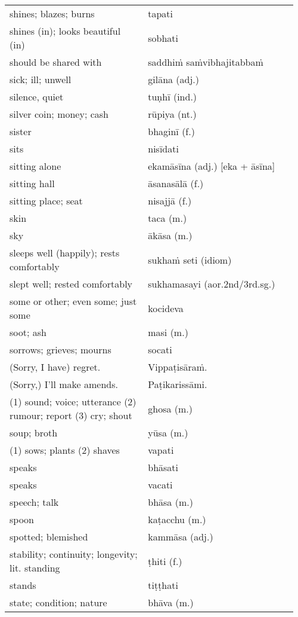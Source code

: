 \documentclass[a5paper]{memoir}
\begin{document}
\begin{longtable}{L{0.48\linewidth} L{0.48\linewidth} H}
shines; blazes; burns & tapati & \\[0pt]
shines (in); looks beautiful (in) & sobhati & \\[0pt]
should be shared with & saddhiṁ saṁvibhajitabbaṁ & \\[0pt]
sick; ill; unwell & gilāna (adj.) & \\[0pt]
silence, quiet & tuṇhī (ind.) & \\[0pt]
silver coin; money; cash & rūpiya (nt.) & \\[0pt]
sister & bhaginī (f.) & \\[0pt]
sits & nisīdati & \\[0pt]
sitting alone & ekamāsīna (adj.) [eka + āsīna] & \\[0pt]
sitting hall & āsanasālā (f.) & \\[0pt]
sitting place; seat & nisajjā (f.) & \\[0pt]
skin & taca (m.) & \\[0pt]
sky & ākāsa (m.) & \\[0pt]
sleeps well (happily); rests comfortably & sukhaṁ seti (idiom) & \\[0pt]
slept well; rested comfortably & sukhamasayi (aor.2nd/3rd.sg.) & \\[0pt]
some or other; even some; just some & kocideva & \\[0pt]
soot; ash & masi (m.) & \\[0pt]
sorrows; grieves; mourns & socati & \\[0pt]
(Sorry, I have) regret. & Vippaṭisāraṁ. & \\[0pt]
(Sorry,) I'll make amends. & Paṭikarissāmi. & \\[0pt]
(1) sound; voice; utterance (2) rumour; report (3) cry; shout & ghosa (m.) & \\[0pt]
soup; broth & yūsa (m.) & \\[0pt]
(1) sows; plants (2) shaves & vapati & \\[0pt]
speaks & bhāsati & \\[0pt]
speaks & vacati & \\[0pt]
speech; talk & bhāsa (m.) & \\[0pt]
spoon & kaṭacchu (m.) & \\[0pt]
spotted; blemished & kammāsa (adj.) & \\[0pt]
stability; continuity; longevity; lit. standing & ṭhiti (f.) & \\[0pt]
stands & tiṭṭhati & \\[0pt]
state; condition; nature & bhāva (m.) & \\[0pt]

\end{longtable}
\end{document}
